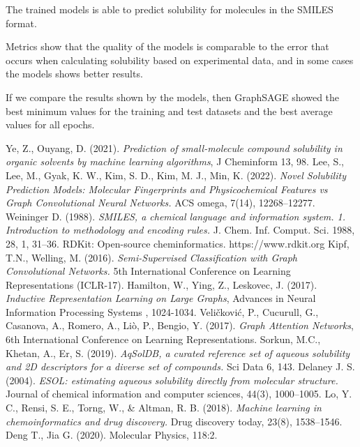 \documentclass[a4paper,14pt]{article}
\begin{document}
The trained models is able to predict solubility for molecules in the SMILES format.

Metrics show that the quality of the models is comparable to the error that occurs when calculating solubility based on experimental data, and in some cases the models shows better results.

If we compare the results shown by the models, then GraphSAGE showed the best minimum values for the training and test datasets and the best average values for all epochs. 

\newpage
\begin{thebibliography}{25}
Ye, Z., Ouyang, D.  (2021). \emph{Prediction of small-molecule compound solubility in organic solvents by machine learning algorithms}, J Cheminform 13, 98.
Lee, S., Lee, M., Gyak, K. W., Kim, S. D., Kim, M. J., Min, K. (2022). \emph{Novel Solubility Prediction Models: Molecular Fingerprints and Physicochemical Features vs Graph Convolutional Neural Networks.} ACS omega, 7(14), 12268–12277.
Weininger D. (1988). \emph{SMILES, a chemical language and information system. 1. Introduction to methodology and encoding rules.} J. Chem. Inf. Comput. Sci. 1988, 28, 1, 31–36.
RDKit: Open-source cheminformatics. https://www.rdkit.org
Kipf, T.N., Welling, M. (2016). \emph{Semi-Supervised Classification with Graph Convolutional Networks.} 5th International Conference on Learning Representations (ICLR-17).
Hamilton, W., Ying, Z., Leskovec, J. (2017). \emph{Inductive Representation Learning on Large Graphs}, Advances in Neural Information Processing Systems , 1024-1034.
Veličković, P., Cucurull, G., Casanova, A., Romero, A., Liò, P., Bengio, Y. (2017). \emph{Graph Attention Networks}, 6th International Conference on Learning Representations.
Sorkun, M.C., Khetan, A., Er, S. (2019). \emph{AqSolDB, a curated reference set of aqueous solubility and 2D descriptors for a diverse set of compounds.} Sci Data 6, 143.
Delaney J. S. (2004). \emph{ESOL: estimating aqueous solubility directly from molecular structure.} Journal of chemical information and computer sciences, 44(3), 1000–1005.
Lo, Y. C., Rensi, S. E., Torng, W., & Altman, R. B. (2018). \emph{Machine learning in chemoinformatics and drug discovery.} Drug discovery today, 23(8), 1538–1546.
Deng T., Jia G. (2020).  Molecular Physics, 118:2.

\end{thebibliography}
\end{document}
